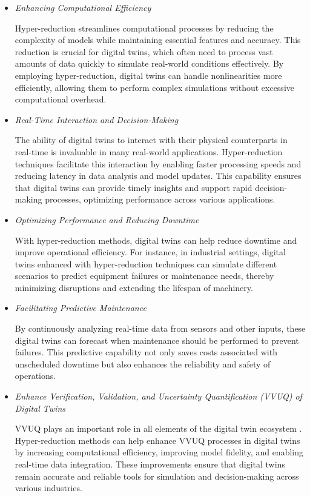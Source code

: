 \documentclass[11pt]{article}
\begin{document}
            \begin{itemize}
                \item \textit{Enhancing Computational Efficiency}

                Hyper-reduction streamlines computational processes by reducing the complexity of models while maintaining essential features and accuracy. This reduction is crucial for digital twins, which often need to process vast amounts of data quickly to simulate real-world conditions effectively. By employing hyper-reduction, digital twins can handle nonlinearities more efficiently, allowing them to perform complex simulations without excessive computational overhead.

                \item \textit{Real-Time Interaction and Decision-Making}

                The ability of digital twins to interact with their physical counterparts in real-time is invaluable in many real-world applications. Hyper-reduction techniques facilitate this interaction by enabling faster processing speeds and reducing latency in data analysis and model updates. This capability ensures that digital twins can provide timely insights and support rapid decision-making processes, optimizing performance across various applications.

                \item \textit{Optimizing Performance and Reducing Downtime}

                With hyper-reduction methods, digital twins can help reduce downtime and improve operational efficiency. For instance, in industrial settings, digital twins enhanced with hyper-reduction techniques can simulate different scenarios to predict equipment failures or maintenance needs, thereby minimizing disruptions and extending the lifespan of machinery.

                \item \textit{Facilitating Predictive Maintenance}

                By continuously analyzing real-time data from sensors and other inputs, these digital twins can forecast when maintenance should be performed to prevent failures. This predictive capability not only saves costs associated with unscheduled downtime but also enhances the reliability and safety of operations.

                \item \textit{Enhance Verification, Validation, and Uncertainty Quantification (VVUQ) of Digital Twins}

                VVUQ plays an important role in all elements of the digital twin ecosystem \cite{engineering2024foundational}. Hyper-reduction methods can help enhance VVUQ processes in digital twins by increasing computational efficiency, improving model fidelity, and enabling real-time data integration. These improvements ensure that digital twins remain accurate and reliable tools for simulation and decision-making across various industries.

            \end{itemize}
\end{document}
